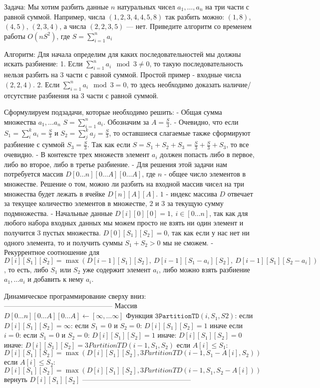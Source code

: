 Задача:
Мы хотим разбить данные $n$ натуральных чисел $a_1, \ldots ,a_n$ на три части с равной суммой. Например, числа $\left(1,2,3,4,4,5,8\right)$ так разбить можно: $(1,8)$, $(4,5)$, $(2,3,4)$, а числа $\left(2,2,3,5\right)$ — нет. Приведите алгоритм со временем работы $O(nS^2)$, где $S=\sum_{i=1}^n a_i$

Алгоритм:
Для начала определим для каких последовательностей мы должны искать разбиение:
1. Если $\sum_{i=1}^n a_i \mod 3 \neq 0$, то такую последовательность нельзя разбить на $3$ части с равной суммой. Простой пример - входные числа $(2, 2, 4)$.
2. Если $\sum_{i=1}^n a_i \mod 3 = 0$, то здесь необходимо доказать наличие/отсутствие разбиения на $3$ части с равной суммой.

Сформулируем подзадачи, которые необходимо решить:
- Общая сумма множества ${a_1, \ldots a_n}$ $S=\sum_{i=1}^n a_i$. Обозначим за $\displaystyle{A = \frac{S}{3}}$.
- Очевидно, что если $\displaystyle{S_1 = \sum_{i}^k a_i = \frac{S}{3}}$ и $\displaystyle{S_2 = \sum_{j}^k a_j = \frac{S}{3}}$, то оставшиеся слагаемые также сформируют разбиение с суммой $\displaystyle{S_3 = \frac{S}{3}}$. Так как если $\displaystyle{S = S_1 + S_2 + S_3 = \frac{S}{3} + \frac{S}{3} + S_3}$, то все очевидно.
- В контексте трех множеств элемент $a_i$ должен попасть либо в первое, либо во второе, либо в третье разбиение.
- Для решения этой задачи нам потребуется массив $D[0 \ldots n][0 \ldots A][0 \ldots A]$, где $n$ - общее число элементов в множестве. Решение о том, можно ли разбить на входной массив чисел на три множества будет лежать в ячейке $D[n][A][A]$. $1$ - индекс массива $D$ отвечает за текущее количество элементов в множестве, $2$ и $3$ за текущую сумму подмножества.
- Начальные данные $D[i][0][0] = 1,\: i \in [0 \ldots n]$, так как для любого набора входных данных мы можем просто не взять ни один элемент и получится $3$ пустых множества.
$D[0][S_1][S_2] = 0$, так как если у нас нет ни одного элемента, то и получить суммы $S_1 + S_2 > 0$ мы не сможем.
- Рекуррентное соотношение для $D[i][S_1][S_2] = \max\left(D[i - 1][S_1][S_2], \: D[i - 1][S_1 - a_i][S_2], \: D[i - 1][S_1][S_2 - a_i]\right)$, то есть, либо $S_1$ или $S_2$ уже содержит элемент $a_i$, либо можно взять разбиение $a_1, \ldots a_i$ и добавить к нему $a_i$.

Динамическое программирование сверху вниз:
-----------------------------------------------
Массив $D[0 \ldots n][0 \ldots A][0 \ldots A] \leftarrow [\infty, \ldots \infty]$
Функция $\texttt{3PartitionTD}(i, S_1, S2)$:
если $D[i][S_1][S_2] = \infty$:
    если $S_1$ = 0 и $S_2 = 0$:
        $D[i][S_1][S_2] = 1$
    иначе если $i = 0$:
        если $S_1 = 0$ и $S_2 = 0$:
            $D[i][S_1][S_2] = 1$
        иначе:
            $D[i][S_1][S_2] = 0$
    иначе:
        $D[i][S_1][S_2] = 3PartitionTD(i - 1, S_1, S_2)$
        если $A[i] \leq S_1$:
            $D[i][S_1][S_2] = \max\left(D[i][S_1][S_2], 3PartitionTD(i - 1, S_1 - A[i], S_2)\right)$
        если $A[i] \leq S_2$:
            $D[i][S_1][S_2] = \max\left(D[i][S_1][S_2], 3PartitionTD(i - 1, S_1, S_2 - A[i])\right)$
вернуть $D[i][S_1][S_2]$
-----------------------------------------------

